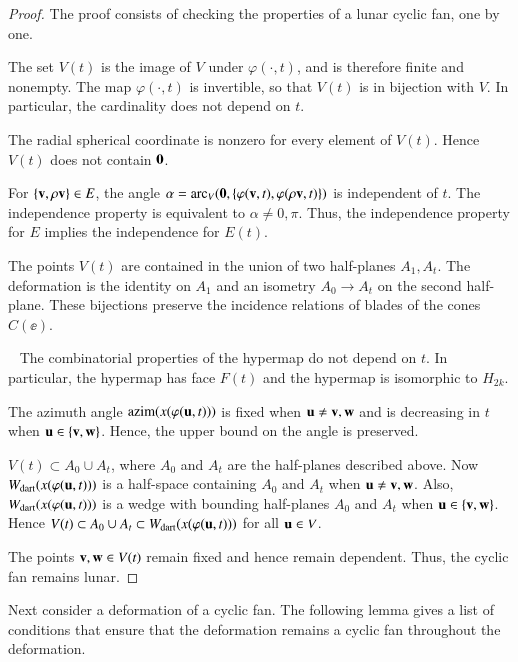 \begin{proof}  The proof consists of checking  the properties of a lunar cyclic fan, one by one.  

 The set $V(t)$ is the image of $V$ under $\varphi(\cdot,t)$, and is therefore finite and nonempty.  The map $\varphi(\cdot,t)$ is invertible, so that $V(t)$ is in bijection with $V$.  In particular, the cardinality does not depend on $t$.

 The radial spherical coordinate is nonzero for every element of $V(t)$.  Hence $V(t)$ does not contain ${\mathbf 0}$.

  For $\{{\mathbf v},\rho {\mathbf v}\}\in E$, the angle 
$\alpha={\operatorname{arc}}_V({\mathbf 0},\{\varphi({\mathbf v},t),\varphi(\rho {\mathbf v},t)\})$
is independent of $t$.  The independence property is equivalent to $\alpha\ne0,\pi$.  Thus, the independence property for $E$ implies
the independence for $E(t)$.

 The points $V(t)$ are contained in the union of two half-planes $A_1,A_t$.  The deformation is the identity on $A_1$ and an isometry $A_0\to A_t$ on the second half-plane.  These bijections preserve the incidence relations of blades of the cones $C(\ee)$.  

~ The combinatorial properties of the hypermap do not depend on $t$.  In particular, the hypermap has face $F(t)$ and the hypermap is isomorphic to $H_{2k}$.

 The azimuth angle ${\operatorname{azim}}(x(\varphi({\mathbf u},t)))$ is fixed when ${\mathbf u}\ne {\mathbf v},{\mathbf w}$ and is decreasing in $t$ when ${\mathbf u}\in \{{\mathbf v},{\mathbf w}\}$.  Hence, the upper bound on the angle is preserved.

  $V(t)\subset A_0\cup A_t$, where $A_0$ and $A_t$ are the
half-planes described above.  Now $W_{\text{dart}}(x(\varphi({\mathbf u},t)))$ is a half-space containing $A_0$ and $A_t$ when ${\mathbf u}\ne {\mathbf v},{\mathbf w}$.  Also, $W_{\text{dart}}(x(\varphi({\mathbf u},t)))$ is a wedge with bounding half-planes $A_0$ and $A_t$ when ${\mathbf u}\in \{{\mathbf v},{\mathbf w}\}$.  Hence
$V(t)\subset A_0\cup A_t\subset W_{\text{dart}}(x(\varphi({\mathbf u},t)))$ for all ${\mathbf u}\in V$.

 The points ${\mathbf v},{\mathbf w}\in V(t)$ remain fixed and hence remain dependent.  Thus, the cyclic fan remains lunar.  
\end{proof}
%

Next  consider a deformation of a cyclic fan.  The following lemma gives a list of conditions that ensure that the deformation remains a cyclic fan throughout the deformation.


